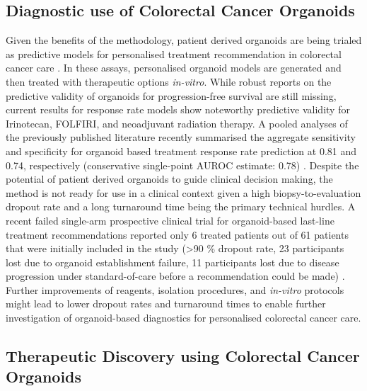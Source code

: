 \begin{flushleft}
\subsection{Diagnostic use of Colorectal Cancer Organoids}

Given the benefits of the methodology, patient derived organoids are being trialed as predictive models for personalised treatment recommendation in colorectal cancer care \parencite{vandeweteringProspectiveDerivationLiving2015, vlachogiannisPatientderivedOrganoidsModel2018, ganeshRectalCancerOrganoid2019, ooftPatientderivedOrganoidsCan2019, yaoPatientDerivedOrganoidsPredict2020a}. In these assays, personalised organoid models are generated and then treated with therapeutic options \textit{in-vitro}. While robust reports on the predictive validity of organoids for progression-free survival are still missing, current results for response rate models show noteworthy predictive validity for Irinotecan, FOLFIRI, and neoadjuvant radiation therapy. A pooled analyses of the previously published literature recently summarised the aggregate sensitivity and specificity for organoid based treatment response rate prediction at 0.81 and 0.74, respectively (conservative single-point AUROC estimate: 0.78) \parencite{wensinkPatientderivedOrganoidsPredictive2021, zhangNoteROCAnalysis2005}. Despite the potential of patient derived organoids to guide clinical decision making, the method is not ready for use in a clinical context given a high biopsy-to-evaluation dropout rate and a long turnaround time being the primary technical hurdles. A recent failed single-arm prospective clinical trial for organoid-based last-line treatment recommendations reported only 6 treated patients out of 61 patients that were initially included in the study (>90 \% dropout rate, 23 participants lost due to organoid establishment failure, 11 participants lost due to disease progression under standard-of-care before a recommendation could be made) \parencite{ooftProspectiveExperimentalTreatment2021}. Further improvements of reagents, isolation procedures, and \textit{in-vitro} protocols might lead to lower dropout rates and turnaround times to enable further investigation of organoid-based diagnostics for personalised colorectal cancer care. \par

\subsection{Therapeutic Discovery using Colorectal Cancer Organoids} 


\end{flushleft}
